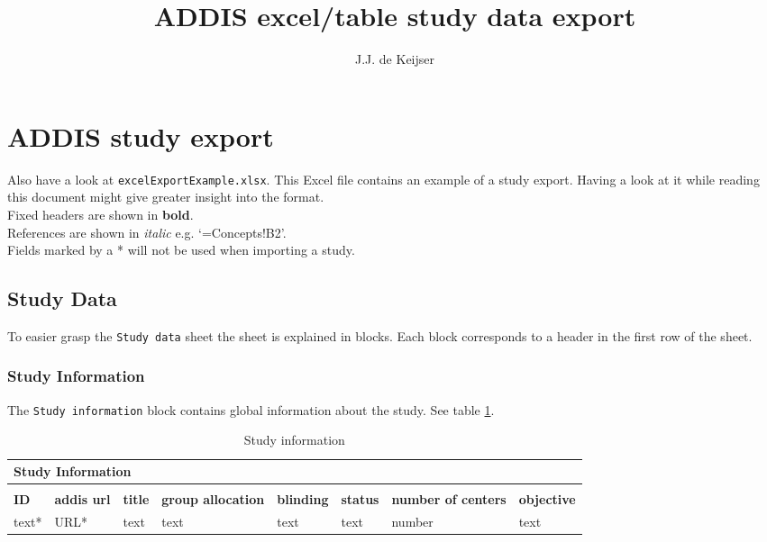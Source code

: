 \documentclass[a4paper,10pt]{article}
\title{ADDIS excel/table study data export}
\author{J.J. de Keijser}
\begin{document}
\maketitle
\section*{ADDIS study export}
Also have a look at \texttt{excelExportExample.xlsx}. This Excel file contains an example of a study export. Having a look at it while reading this document might give greater insight into the format.\\
Fixed headers are shown in \textbf{bold}.\\
References are shown in \textit{italic} e.g. `=Concepts!B2'.\\
Fields marked by a * will not be used when importing a study.

\subsection*{Study Data}
To easier grasp the \texttt{Study data} sheet the sheet is explained in blocks. Each block corresponds to a header in the first row of the sheet.

\subsubsection*{Study Information}
The \texttt{Study information} block contains global information about the study. See table \ref{table:Study Information}.
\begin{table}[h]
  \small
  \centering
  \caption{Study information}
  \label{table:Study Information}
  \begin{tabular}{|l|l|l|l|l|l|l|l|}
    \hline
    \multicolumn{8}{|l|}{Study Information} \\ \hline
    \multicolumn{8}{|l|}{}                  \\ \hline
    \textbf{ID} & \textbf{addis url} & \textbf{title} & \textbf{group allocation} & \textbf{blinding} & \textbf{status} & \textbf{number of centers} & \textbf{objective} \\ \hline
    text* & URL* & text & text & text & text & number & text \\ \hline
  \end{tabular}
\end{table}
\end{document}

